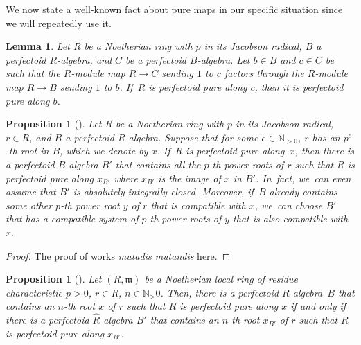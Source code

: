 \documentclass[JEP,XML,SOM,Unicode,published]{cedram}
\theoremstyle{plain}
\newtheorem{proposition}[theorem]{Proposition}
\newtheorem{lemma}[theorem]{Lemma}
\theoremstyle{definition}
\numberwithin{equation}{theorem}
\newcommand{\N}{\mathbb {N}}
\newcommand{\fram}{\mathfrak{m}}
\newcommand{\pe}{{p^e}}
\begin{document}
We now state a well-known fact about pure maps in our specific situation since we will repeatedly use it.

\begin{lemma}\label{pfd pure with smaller root}
Let $R$ be a Noetherian ring with $p$ in its Jacobson radical, $B$ a perfectoid $R$\nobreakdash-algebra, and $C$ be a perfectoid $B$-algebra. Let $b\in B$ and $c\in C$ be such that the $R$\nobreakdash-module map $R\to C$ sending $1$ to $c$ factors through the $R$\nobreakdash-module map $R\to B$ sending $1$ to $b$. If~$R$ is perfectoid pure along $c$, then it is perfectoid pure along $b$.
\end{lemma}

\begin{proposition}[]\label{pfd pure can be with alg closed alg}
Let $R$ be a Noetherian ring with $p$ in its Jacobson radical, $r\in R$, and $B$ a perfectoid $R$ algebra. Suppose that for some $e\in \N_{>0}$, $r$ has an $\pe$-th root in $B$, which we denote by $x$. If~$R$ is perfectoid pure along~$x$, then there is a perfectoid $B$-algebra $B'$ that contains all the $p$-th power roots of $r$ such that $R$ is perfectoid pure along $x_{B'}$ where $x_{B'}$ is the image of $x$ in $B'$. In~fact, we~can even assume that $B'$ is absolutely integrally closed. Moreover, if~$B$ already contains some other $p$-th power root $y$ of $r$ that is compatible with $x$, we~can choose $B'$ that has a compatible system of $p$-th power roots of $y$ that is also compatible with $x$.
\end{proposition}

\begin{proof}
The proof of \cite[Lem.\,4.5]{BMPSTWWPerfectoidPure} works \emph{mutadis mutandis} here.
\end{proof}

\begin{proposition}[{\cf \cite[Lem.\,4.8]{BMPSTWWPerfectoidPure}}]\label{pfd pure iff completion pfd pure}
Let $(R,\fram)$ be a Noetherian local ring of residue characteristic $p>0$, $r\in R$, $n\in \N_>0$. Then, there is a perfectoid $R$\nobreakdash-algebra~$B$ that contains an $n$-th root $x$ of $r$ such that $R$ is perfectoid pure along $x$ if and only if there is a perfectoid $\widehat{R}$ algebra $B'$ that contains an $n$-th root $x_{B'}$ of $r$ such that $R$ is perfectoid pure along $x_{B'}$.
\end{proposition}
\end{document}
